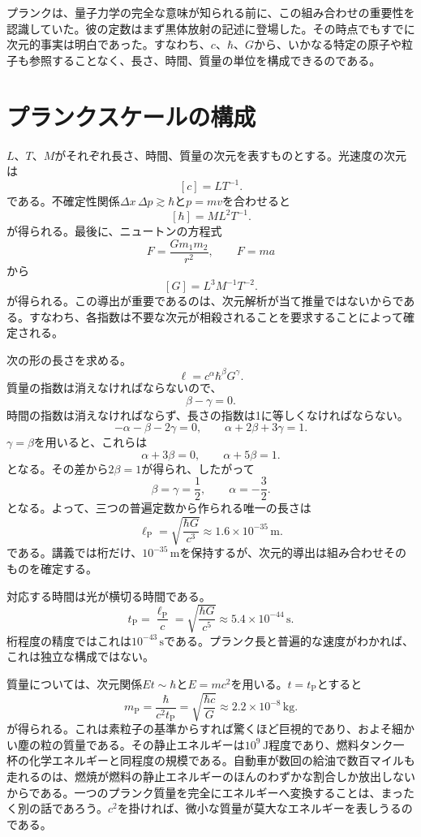 プランクは、量子力学の完全な意味が知られる前に、この組み合わせの重要性を認識していた。彼の定数はまず黒体放射の記述に登場した。その時点でもすでに次元的事実は明白であった。すなわち、\(c\)、\(\hbar\)、\(G\)から、いかなる特定の原子や粒子も参照することなく、長さ、時間、質量の単位を構成できるのである。

\section{プランクスケールの構成}

\(L\)、\(T\)、\(M\)がそれぞれ長さ、時間、質量の次元を表すものとする。光速度の次元は
\[
[c]=LT^{-1}.
\]
である。不確定性関係\(\Delta x\,\Delta p\gtrsim\hbar\)と\(p=mv\)を合わせると
\[
[\hbar]=ML^2T^{-1}.
\]
が得られる。最後に、ニュートンの方程式
\[
F=\frac{Gm_1m_2}{r^2},
\qquad
F=ma
\]
から
\[
[G]=L^3M^{-1}T^{-2}.
\]
が得られる。この導出が重要であるのは、次元解析が当て推量ではないからである。すなわち、各指数は不要な次元が相殺されることを要求することによって確定される。

次の形の長さを求める。
\begin{equation}
\ell=c^\alpha\hbar^\beta G^\gamma.
\label{eq:c10-length-ansatz}
\end{equation}
質量の指数は消えなければならないので、
\[
\beta-\gamma=0.
\]
時間の指数は消えなければならず、長さの指数は1に等しくなければならない。
\[
-\alpha-\beta-2\gamma=0,
\qquad
\alpha+2\beta+3\gamma=1.
\]
\(\gamma=\beta\)を用いると、これらは
\[
\alpha+3\beta=0,
\qquad
\alpha+5\beta=1.
\]
となる。その差から\(2\beta=1\)が得られ、したがって
\[
\beta=\gamma=\frac12,
\qquad
\alpha=-\frac32.
\]
となる。よって、三つの普遍定数から作られる唯一の長さは
\begin{equation}
\ell_{\mathrm P}
=\sqrt{\frac{\hbar G}{c^3}}
\approx 1.6\times10^{-35}\,\mathrm m.
\label{eq:c10-planck-length}
\end{equation}
である。講義では桁だけ、\(10^{-35}\,\mathrm m\)を保持するが、次元的導出は組み合わせそのものを確定する。

対応する時間は光が横切る時間である。
\begin{equation}
t_{\mathrm P}
=\frac{\ell_{\mathrm P}}{c}
=\sqrt{\frac{\hbar G}{c^5}}
\approx 5.4\times10^{-44}\,\mathrm s.
\label{eq:c10-planck-time}
\end{equation}
桁程度の精度ではこれは\(10^{-43}\,\mathrm s\)である。プランク長と普遍的な速度がわかれば、これは独立な構成ではない。

質量については、次元関係\(Et\sim\hbar\)と\(E=mc^2\)を用いる。\(t=t_{\mathrm P}\)とすると
\begin{equation}
m_{\mathrm P}
=\frac{\hbar}{c^2t_{\mathrm P}}
=\sqrt{\frac{\hbar c}{G}}
\approx 2.2\times10^{-8}\,\mathrm{kg}.
\label{eq:c10-planck-mass}
\end{equation}
が得られる。これは素粒子の基準からすれば驚くほど巨視的であり、およそ細かい塵の粒の質量である。その静止エネルギーは\(10^9\,\mathrm J\)程度であり、燃料タンク一杯の化学エネルギーと同程度の規模である。自動車が数回の給油で数百マイルも走れるのは、燃焼が燃料の静止エネルギーのほんのわずかな割合しか放出しないからである。一つのプランク質量を完全にエネルギーへ変換することは、まったく別の話であろう。\(c^2\)を掛ければ、微小な質量が莫大なエネルギーを表しうるのである。

